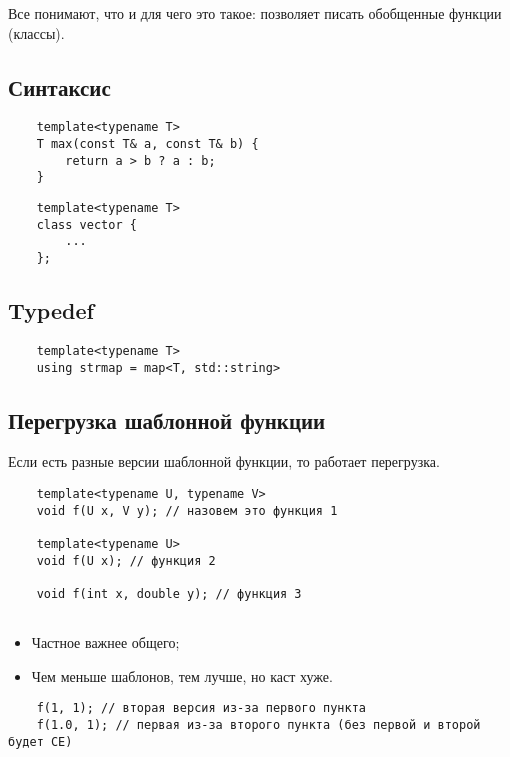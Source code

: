 \documentclass[12pt]{article}
\begin{document}
Все понимают, что и для чего это такое: позволяет писать обобщенные функции (классы). 

\subsection{Синтаксис}

\begin{lstlisting}
	template<typename T> 
	T max(const T& a, const T& b) {
		return a > b ? a : b;
	}
\end{lstlisting}

\begin{lstlisting}
	template<typename T>
	class vector {
		...
	};
\end{lstlisting}

\subsection{Typedef}

\begin{lstlisting}
	template<typename T>
	using strmap = map<T, std::string>
\end{lstlisting}

\subsection{Перегрузка шаблонной функции}

Если есть разные версии шаблонной функции, то работает перегрузка. 

\begin{lstlisting}
	template<typename U, typename V>
	void f(U x, V y); // назовем это функция 1
	
	template<typename U>
	void f(U x); // функция 2
	
	void f(int x, double y); // функция 3
	
\end{lstlisting}

\begin{itemize}
	\item Частное важнее общего;
	\item Чем меньше шаблонов, тем лучше, но каст хуже. 
\end{itemize}

\begin{lstlisting}
	f(1, 1); // вторая версия из-за первого пункта
	f(1.0, 1); // первая из-за второго пункта (без первой и второй будет CE)
\end{lstlisting}
\end{document}
